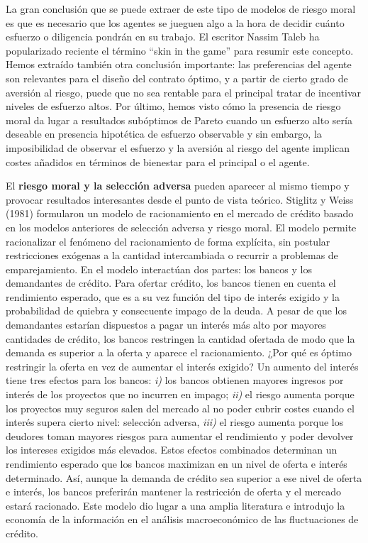 \documentclass{nuevotema}
\begin{document}
La gran conclusión que se puede extraer de este tipo de modelos de riesgo moral es que es necesario que los agentes se jueguen algo a la hora de decidir cuánto esfuerzo o diligencia pondrán en su trabajo. El escritor Nassim Taleb ha popularizado reciente el término ``skin in the game'' para resumir este concepto. Hemos extraído también otra conclusión importante: las preferencias del agente son relevantes para el diseño del contrato óptimo, y a partir de cierto grado de aversión al riesgo, puede que no sea rentable para el principal tratar de incentivar niveles de esfuerzo altos. Por último, hemos visto cómo la presencia de riesgo moral da lugar a resultados subóptimos de Pareto cuando un esfuerzo alto sería deseable en presencia hipotética de esfuerzo observable y sin embargo, la imposibilidad de observar el esfuerzo y la aversión al riesgo del agente implican costes añadidos en términos de bienestar para el principal o el agente.

El \textbf{riesgo moral y la selección adversa} pueden aparecer al mismo tiempo y provocar resultados interesantes desde el punto de vista teórico. Stiglitz y Weiss (1981) formularon un modelo de racionamiento en el mercado de crédito basado en los modelos anteriores de selección adversa y riesgo moral. El modelo permite racionalizar el fenómeno del racionamiento de forma explícita, sin postular restricciones exógenas a la cantidad intercambiada o recurrir a problemas de emparejamiento. En el modelo interactúan dos partes: los bancos y los demandantes de crédito. Para ofertar crédito, los bancos tienen en cuenta el rendimiento esperado, que es a su vez función del tipo de interés exigido y la probabilidad de quiebra y consecuente impago de la deuda. A pesar de que los demandantes estarían dispuestos a pagar un interés más alto por mayores cantidades de crédito, los bancos restringen la cantidad ofertada de modo que la demanda es superior a la oferta y aparece el racionamiento. ¿Por qué es óptimo restringir la oferta en vez de aumentar el interés exigido? Un aumento del interés tiene tres efectos para los bancos: \textit{i)} los bancos obtienen mayores ingresos por interés de los proyectos que no incurren en impago; \textit{ii)} el riesgo aumenta porque los proyectos muy seguros salen del mercado al no poder cubrir costes cuando el interés supera cierto nivel: selección adversa, \textit{iii)} el riesgo aumenta porque los deudores toman mayores riesgos para aumentar el rendimiento y poder devolver los intereses exigidos más elevados. Estos efectos combinados determinan un rendimiento esperado que los bancos maximizan en un nivel de oferta e interés determinado. Así, aunque la demanda de crédito sea superior a ese nivel de oferta e interés, los bancos preferirán mantener la restricción de oferta y el mercado estará racionado. Este modelo dio lugar a una amplia literatura e introdujo la economía de la información en el análisis macroeconómico de las fluctuaciones de crédito.
\end{document}
